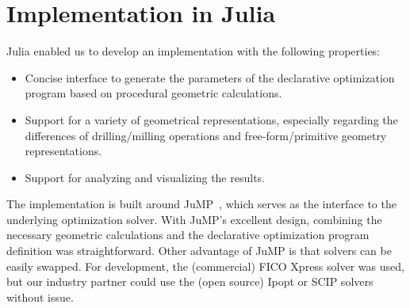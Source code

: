 \documentclass{juliacon}
\begin{document}
\section{Implementation in Julia}
\label{sec:approach}


Julia enabled us to develop an implementation with the following properties:
\begin{itemize}
	\item Concise interface to generate the parameters of the declarative optimization program based on procedural geometric calculations.
	\item Support for a variety of geometrical representations, especially regarding the differences of drilling/milling operations and free-form/primitive geometry representations.
	\item Support for analyzing and visualizing the results.
\end{itemize}

The implementation is built around JuMP~\cite{Lubin2023}, which serves as the interface to the underlying optimization solver.
With JuMP's excellent design, combining the necessary geometric calculations and the declarative optimization program definition was straightforward.
Other advantage of JuMP is that solvers can be easily swapped.
For development, the (commercial) FICO Xpress solver was used, but our industry partner could use the (open source) Ipopt or SCIP solvers without issue.
\end{document}
